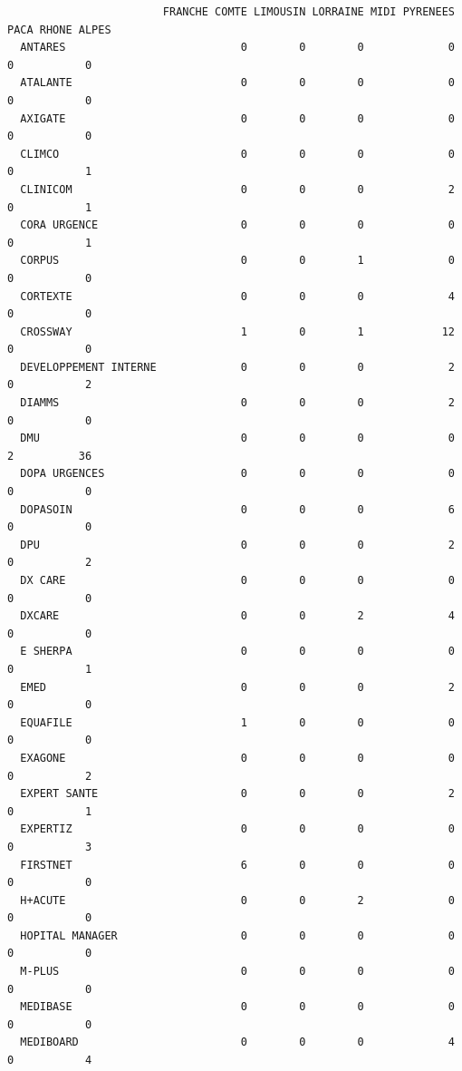 \documentclass[]{article}
\begin{document}
\begin{verbatim}
                        FRANCHE COMTE LIMOUSIN LORRAINE MIDI PYRENEES PACA RHONE ALPES
  ANTARES                           0        0        0             0    0           0
  ATALANTE                          0        0        0             0    0           0
  AXIGATE                           0        0        0             0    0           0
  CLIMCO                            0        0        0             0    0           1
  CLINICOM                          0        0        0             2    0           1
  CORA URGENCE                      0        0        0             0    0           1
  CORPUS                            0        0        1             0    0           0
  CORTEXTE                          0        0        0             4    0           0
  CROSSWAY                          1        0        1            12    0           0
  DEVELOPPEMENT INTERNE             0        0        0             2    0           2
  DIAMMS                            0        0        0             2    0           0
  DMU                               0        0        0             0    2          36
  DOPA URGENCES                     0        0        0             0    0           0
  DOPASOIN                          0        0        0             6    0           0
  DPU                               0        0        0             2    0           2
  DX CARE                           0        0        0             0    0           0
  DXCARE                            0        0        2             4    0           0
  E SHERPA                          0        0        0             0    0           1
  EMED                              0        0        0             2    0           0
  EQUAFILE                          1        0        0             0    0           0
  EXAGONE                           0        0        0             0    0           2
  EXPERT SANTE                      0        0        0             2    0           1
  EXPERTIZ                          0        0        0             0    0           3
  FIRSTNET                          6        0        0             0    0           0
  H+ACUTE                           0        0        2             0    0           0
  HOPITAL MANAGER                   0        0        0             0    0           0
  M-PLUS                            0        0        0             0    0           0
  MEDIBASE                          0        0        0             0    0           0
  MEDIBOARD                         0        0        0             4    0           4

\end{verbatim}
\end{document}

